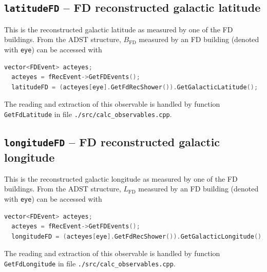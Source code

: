 \documentclass[12pt,a4paper]{report}
\begin{document}
\subsection{\texttt{latitudeFD} -- FD reconstructed galactic latitude}
This is the reconstructed galactic latitude as measured by one of the FD buildings. From the ADST structure, $B_{\textrm{FD}}$ measured by an FD building (denoted with \texttt{eye}) can be accessed with
\begin{lstlisting}[language=C++]
  vector<FDEvent> acteyes;
  acteyes = fRecEvent->GetFDEvents();
  latitudeFD = (acteyes[eye].GetFdRecShower()).GetGalacticLatitude();
\end{lstlisting}
The reading and extraction of this observable is handled by function \texttt{GetFdLatitude} in file \texttt{./src/calc\_observables.cpp}.
\subsection{\texttt{longitudeFD} -- FD reconstructed galactic longitude}
This is the reconstructed galactic longitude as measured by one of the FD buildings. From the ADST structure, $L_{\textrm{FD}}$ measured by an FD building (denoted with \texttt{eye}) can be accessed with
\begin{lstlisting}[language=C++]
  vector<FDEvent> acteyes;
  acteyes = fRecEvent->GetFDEvents();
  longitudeFD = (acteyes[eye].GetFdRecShower()).GetGalacticLongitude();
\end{lstlisting}
The reading and extraction of this observable is handled by function \texttt{GetFdLongitude} in file \texttt{./src/calc\_observables.cpp}.
\end{document}
